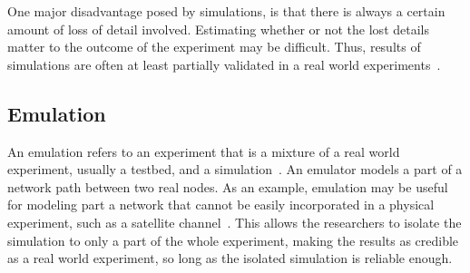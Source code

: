 One major disadvantage posed by simulations, is that there is always a certain amount of loss of detail involved. Estimating whether or not the lost details matter to the outcome of the experiment may be difficult. Thus, results of simulations are often at least partially validated in a real world experiments~\cite{Allman99}.    

\subsection{Emulation}

An emulation refers to an experiment that is a mixture of a real world experiment, usually a testbed, and a simulation~\cite{Allman99}. An emulator models a part of a network path between two real nodes. As an example, emulation may be useful for modeling part a network that cannot be easily incorporated in a physical experiment, such as a satellite channel~\cite{Allman99}. This allows the researchers to isolate the simulation to only a part of the whole experiment, making the results as credible as a real world experiment, so long as the isolated simulation is reliable enough.   